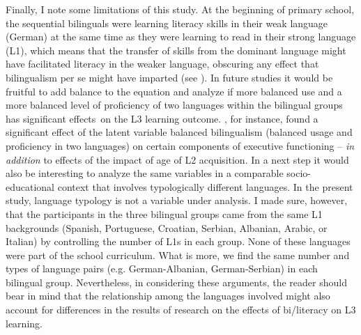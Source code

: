 \documentclass[output=paper,modfonts,nonflat,newtxmath]{langsci/langscibook}
\begin{document}
Finally, I note some limitations of this study. At the beginning of primary school, the sequential bilinguals were learning literacy skills in their weak language (German) at the same time as they were learning to read in their strong language (L1), which means that the transfer of skills from the dominant language might have facilitated literacy in the weaker language, obscuring any effect that bilingualism per se might have imparted (see \citealt{Bialystok2007}). In future studies it would be fruitful to add balance to the equation and analyze if more balanced use and a more balanced level of proficiency of two languages within the bilingual groups has significant effects~on the L3 learning outcome. \citet{YowLi2015}, for instance, found a significant effect of the latent variable balanced bilingualism (balanced usage and proficiency in two languages) on certain components of executive functioning – \textit{in} \textit{addition} to effects of the impact of age of L2 acquisition. In a next step it would also be interesting to analyze the same variables in a comparable socio-educational context that involves typologically different languages. In the present study, language typology is not a variable under analysis. I made sure, however, that the participants in the three bilingual groups came from the same L1 backgrounds (Spanish, Portuguese, Croatian, Serbian, Albanian, Arabic, or Italian) by controlling the number of L1s in each group. None of these languages were part of the school curriculum. What is more, we find the same number and types of language pairs (e.g. German-Albanian, German-Serbian) in each bilingual group. Nevertheless, in considering these arguments, the reader should bear in mind that the relationship among the languages involved might also account for differences in the results of research on the effects of bi/literacy on L3 learning.


\end{document}
